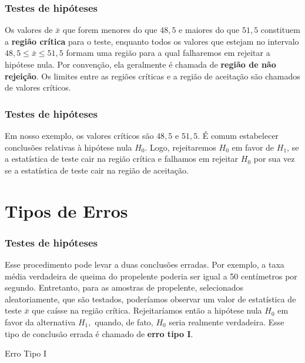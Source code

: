 \documentclass[14pt,aspectratio=1610]{beamer}
\begin{document}
\begin{frame}{}
\frametitle{Testes de hipóteses}
\begin{block}{}
\justifying
Os valores de $\bar{x}$ que forem menores do que $48,5$ e maiores do que $51,5$ constituem a \textbf{região crítica} para o teste, enquanto todos os valores que estejam 
no intervalo $48,5 \leq \bar{x}\leq 51,5$ formam uma região para a qual falharemos em rejeitar a hipótese nula. Por convenção, ela geralmente é chamada de 
\textbf{região de não rejeição}. Os limites entre as regiões críticas e a região de aceitação são chamados de valores críticos. 
 \end{block}
\end{frame}

\begin{frame}{}
\frametitle{Testes de hipóteses}
\begin{block}{}
\justifying
Em nosso exemplo, os valores críticos são $48,5$ e $51,5.$ É comum estabelecer conclusões relativas à hipótese nula $H_{0}.$ Logo, rejeitaremos $H_{0}$ em favor 
de $H_{1}$, se a estatística de teste cair na região crítica e falhamos em rejeitar $H_{0}$ por sua vez se a estatística de teste cair na região de aceitação.
 \end{block}
\end{frame}

\section{Tipos de Erros}
\begin{frame}{}
\frametitle{Testes de hipóteses}
\small
\begin{block}{}
\justifying
Esse procedimento pode levar a duas conclusões erradas. Por exemplo, a taxa média verdadeira de queima do propelente poderia ser igual a 50 centímetros por segundo. 
Entretanto, para as amostras de propelente, selecionados aleatoriamente, que são testados, poderíamos observar um valor de estatística de teste $\bar{x}$ que 
caísse na região crítica. Rejeitaríamos então a hipótese nula $H_{0}$ em favor da alternativa $H_{1},$ quando, de fato, $H_{0}$ seria realmente verdadeira. Esse tipo de 
conclusão errada é chamado de \textbf{erro tipo I}.
 \end{block}
\pause
\begin{block}{Erro Tipo I}

\end{block}
\end{frame}
\end{document}
